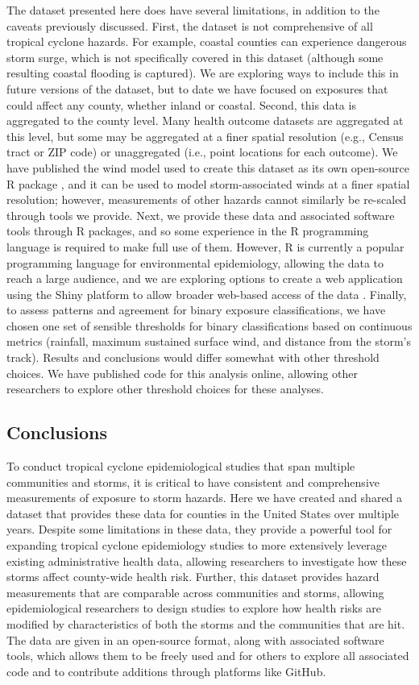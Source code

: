 The dataset presented here does have several limitations, in addition to the
caveats previously discussed. First, the dataset is not comprehensive of all
tropical cyclone hazards. For example, coastal counties can experience
dangerous storm surge, which is not specifically covered in this dataset
(although some resulting coastal flooding is captured). We are exploring ways
to include this in future versions of the dataset, but to date we have
focused on exposures that could affect any county, whether inland or coastal.
Second, this data is aggregated to the county level. Many health outcome
datasets are aggregated at this level, but some may be aggregated at a finer
spatial resolution (e.g., Census tract or ZIP code) or unaggregated (i.e.,
point locations for each outcome). We have published the wind model used to
create this dataset as its own open-source R package
\parencite{stormwindmodel}, and it can be used to model storm-associated winds
at a finer spatial resolution; however, measurements of other hazards cannot
similarly be re-scaled through tools we provide. Next, we provide these data
and associated software tools through R packages, and so some experience in the
R programming language is required to make full use of them. However, R is
currently a popular programming language for environmental epidemiology,
allowing the data to reach a large audience, and we are exploring options to
create a web application using the Shiny platform to allow broader web-based
access of the data \parencite{shiny2019}.  Finally, to assess patterns and
agreement for binary exposure classifications, we have chosen one set of
sensible thresholds for binary classifications based on continuous metrics
(rainfall, maximum sustained surface wind, and distance from the storm's track).
Results and conclusions would differ somewhat with other threshold choices. We
have published code for this analysis online, allowing
other researchers to explore other threshold choices for these
analyses.

\subsection*{Conclusions}

To conduct tropical cyclone epidemiological studies that span multiple
communities and storms, it is critical to have consistent and comprehensive
measurements of exposure to storm hazards. Here we have created and shared a
dataset that provides these data for counties in the United States over
multiple years. Despite some limitations in these data, they provide a powerful
tool for expanding tropical cyclone epidemiology studies to more extensively
leverage existing administrative health data, allowing researchers to
investigate how these storms affect county-wide health risk.  Further, this
dataset provides hazard measurements that are comparable across communities and
storms, allowing epidemiological researchers to design studies to explore
how health risks are modified by characteristics of both the storms and the
communities that are hit. The data are given in an open-source format, along
with associated software tools, which allows them to be freely used and for
others to explore all associated code and to contribute additions through
platforms like GitHub.

